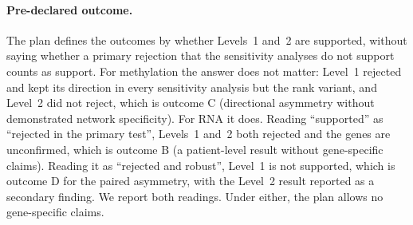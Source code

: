 \paragraph{Pre-declared outcome.} The plan defines the outcomes by whether Levels~1 and~2 are supported, without saying whether a primary rejection that the sensitivity analyses do not support counts as support. For methylation the answer does not matter: Level~1 rejected and kept its direction in every sensitivity analysis but the rank variant, and Level~2 did not reject, which is outcome C (directional asymmetry without demonstrated network specificity). For RNA it does. Reading ``supported'' as ``rejected in the primary test'', Levels~1 and~2 both rejected and the genes are unconfirmed, which is outcome B (a patient-level result without gene-specific claims). Reading it as ``rejected and robust'', Level~1 is not supported, which is outcome D for the paired asymmetry, with the Level~2 result reported as a secondary finding. We report both readings. Under either, the plan allows no gene-specific claims.
